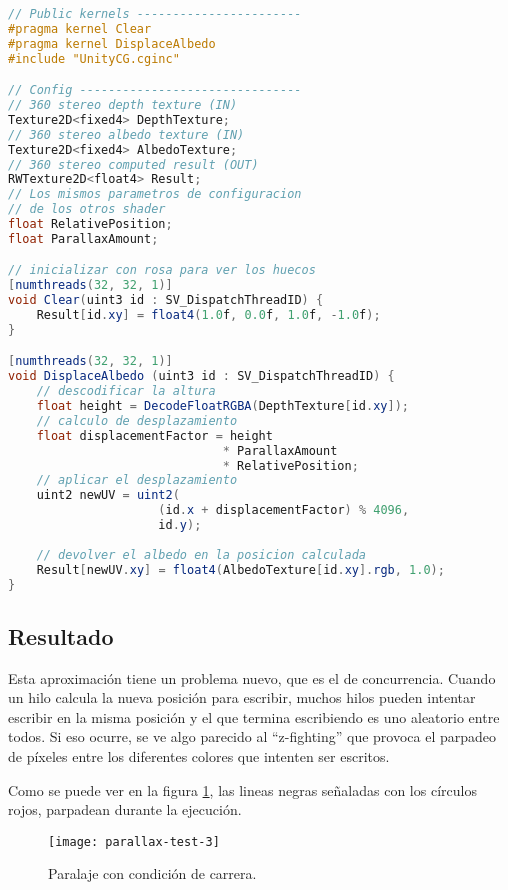 \begin{lstlisting}[language=glsl]
// Public kernels -----------------------
#pragma kernel Clear
#pragma kernel DisplaceAlbedo
#include "UnityCG.cginc"

// Config -------------------------------
// 360 stereo depth texture (IN)
Texture2D<fixed4> DepthTexture;
// 360 stereo albedo texture (IN)
Texture2D<fixed4> AlbedoTexture;
// 360 stereo computed result (OUT)
RWTexture2D<float4> Result;
// Los mismos parametros de configuracion 
// de los otros shader
float RelativePosition;
float ParallaxAmount;

// inicializar con rosa para ver los huecos
[numthreads(32, 32, 1)]
void Clear(uint3 id : SV_DispatchThreadID) {
    Result[id.xy] = float4(1.0f, 0.0f, 1.0f, -1.0f);
}

[numthreads(32, 32, 1)]
void DisplaceAlbedo (uint3 id : SV_DispatchThreadID) {
    // descodificar la altura
    float height = DecodeFloatRGBA(DepthTexture[id.xy]);
    // calculo de desplazamiento
    float displacementFactor = height 
                              * ParallaxAmount 
                              * RelativePosition;
    // aplicar el desplazamiento
    uint2 newUV = uint2(
                     (id.x + displacementFactor) % 4096, 
                     id.y);
    
    // devolver el albedo en la posicion calculada
    Result[newUV.xy] = float4(AlbedoTexture[id.xy].rgb, 1.0);
}
\end{lstlisting}

\subsection{Resultado}
Esta aproximación tiene un problema nuevo, que es el de concurrencia. Cuando un hilo calcula la nueva posición para escribir, muchos hilos pueden intentar escribir en la misma posición y el que termina escribiendo es uno aleatorio entre todos. Si eso ocurre, se ve algo parecido al ``z-fighting'' que provoca el parpadeo de píxeles entre los diferentes colores que intenten ser escritos.

Como se puede ver en la figura \ref{fig:parallax-test-3}, las lineas negras señaladas con los círculos rojos, parpadean durante la ejecución.

\begin{figure}[H]
  \centering
  \texttt{[image: parallax-test-3]}
  \caption{Paralaje con condición de carrera.}
  \label{fig:parallax-test-3}
\end{figure}
\FloatBarrier

